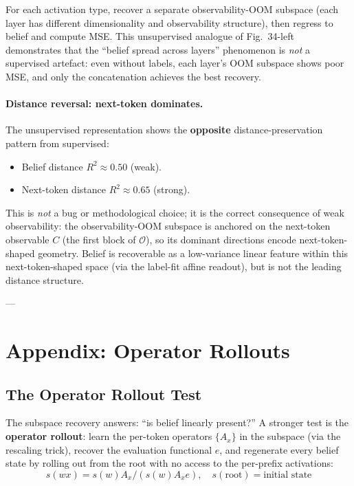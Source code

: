 \documentclass[11pt]{article}
\begin{document}
For each activation type, recover a separate observability-OOM subspace (each layer has different dimensionality and observability structure), then regress to belief and compute MSE. This unsupervised analogue of Fig.\ 34-left demonstrates that the ``belief spread across layers'' phenomenon is \textit{not} a supervised artefact: even without labels, each layer's OOM subspace shows poor MSE, and only the concatenation achieves the best recovery.

\paragraph{Distance reversal: next-token dominates.}

The unsupervised representation shows the \textbf{opposite} distance-preservation pattern from supervised:
\begin{itemize}
\item Belief distance $R^2 \approx 0.50$ (weak).
\item Next-token distance $R^2 \approx 0.65$ (strong).
\end{itemize}

This is \textit{not} a bug or methodological choice; it is the correct consequence of weak observability: the observability-OOM subspace is anchored on the next-token observable $C$ (the first block of $\mathcal{O}$), so its dominant directions encode next-token-shaped geometry. Belief is recoverable as a low-variance linear feature within this next-token-shaped space (via the label-fit affine readout), but is not the leading distance structure.


---

\section{Appendix: Operator Rollouts}

\subsection{The Operator Rollout Test}

The subspace recovery answers: ``is belief linearly present?'' A stronger test is the \textbf{operator rollout}: learn the per-token operators $\{A_x\}$ in the subspace (via the rescaling trick), recover the evaluation functional $e$, and regenerate every belief state by rolling out from the root with no access to the per-prefix activations:
\begin{equation}
s(wx) = s(w) A_x / (s(w) A_x e), \quad s(\text{root}) = \text{initial state}
\end{equation}
\end{document}

